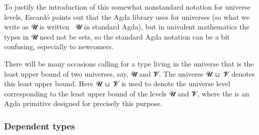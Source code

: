 
To justify the introduction of this somewhat nonstandard notation for universe levels, Escardó points out that the Agda library uses  for universes (so what we write as \ab 𝓤\af ̇ is written ~\ab 𝓤 in standard Agda), but in univalent mathematics the types in \ab 𝓤\af ̇ need not be sets, so the standard Agda notation can be
a bit confusing, especially to newcomers.

There will be many occasions calling for a type living in the universe that is the least upper bound of two universes, say, \ab 𝓤\af ̇ and \ab 𝓥\af ̇. The universe \ab 𝓤~\apr ⊔~\ab 𝓥\af ̇ denotes this least upper bound. Here \ab 𝓤~\apr ⊔~\ab 𝓥 is used to denote the universe level corresponding to the least upper bound of the levels \ab 𝓤 and \ab 𝓥, where the  is an Agda primitive designed for precisely this purpose.


\subsubsection{Dependent types}\label{sec:dependent-types}

\newcommand\FstUnder{\AgdaOperator{\AgdaFunction{∣\AgdaUnderscore{}∣}}\xspace}
\newcommand\SndUnder{\AgdaOperator{\AgdaFunction{∥\AgdaUnderscore{}∥}}\xspace}








